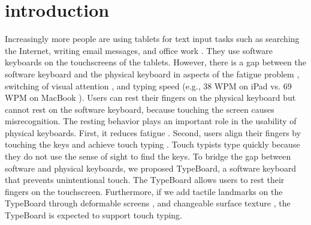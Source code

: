 \section{introduction}


Increasingly more people are using tablets for text input tasks such as searching the Internet, writing email messages, and office work \cite{2018-Japanese}. They use software keyboards on the touchscreens of the tablets. However, there is a gap between the software keyboard and the physical keyboard in aspects of the fatigue problem \cite{2014-Differences}, switching of visual attention \cite{2017-BlindType, 2010-NoLook, 2010-Eyes}, and typing speed \cite{1991-Improving, 2011-Typing} (e.g., 38 WPM on iPad vs. 69 WPM on MacBook \cite{2010-Keyboard}). Users can rest their fingers on the physical keyboard but cannot rest on the software keyboard, because touching the screen causes misrecognition. The resting behavior plays an important role in the usability of physical keyboards. First, it reduces fatigue \cite{2013-TapBoard}. Second, users align their fingers by touching the keys and achieve touch typing \cite{2010-Warning, 1995-Use, 2011-Hierarchical, 2015-Haptic}. Touch typists type quickly because they do not use the sense of sight to find the keys. To bridge the gap between software and physical keyboards, we proposed TypeBoard, a software keyboard that prevents unintentional touch. The TypeBoard allows users to rest their fingers on the touchscreen. Furthermore, if we add tactile landmarks on the TypeBoard through deformable screens \cite{Website-Tactus}, and changeable surface texture \cite{2011-Stimtac, 2010-TeslaTouch, 2011-Enhancing}, the TypeBoard is expected to support touch typing.


